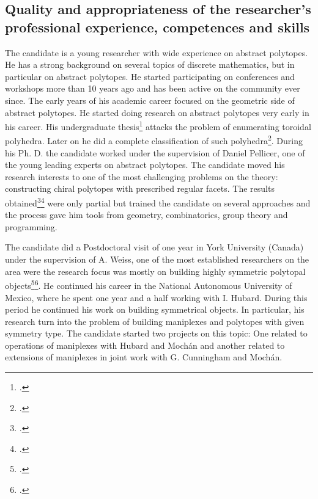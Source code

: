 \subsection{Quality and appropriateness of the researcher’s professional experience, competences and skills}
\label{sec:experience}


The candidate is a young researcher with wide experience on abstract polytopes.
He has a strong background on several topics of discrete mathematics, but in particular on abstract polytopes.
He started participating on conferences and workshops more than 10 years ago and has been active on the community ever since.
The early years of his academic career focused on the geometric side of abstract polytopes. He started doing research on abstract polytopes very early in his career. His undergraduate thesis\footcite{Montero_2013_PoliedrosRegularesEn} attacks the problem of enumerating toroidal polyhedra.
Later on he did a complete classification of such polyhedra\footcite{Montero_2018_RegularPolyhedra3}.
During his Ph. D. the candidate worked under the supervision of Daniel Pellicer, one of the young leading experts on abstract polytopes.
The candidate moved his research interests to one of the most challenging problems on the theory: constructing chiral polytopes with prescribed regular facets.
The results obtained\footcite{Montero_2019_ChiralExtensionsToroids_PhDThesis}\footcite{MonteroPellicerToledo__ChiralExtensionsRegular_preprint} were only partial but trained the candidate on several approaches and the process gave him tools from geometry, combinatorics, group theory and programming.

The candidate did a Postdoctoral visit of one year in York University (Canada) under the supervision of A. Weiss, one of the most established researchers on the area were the research focus was mostly on building highly symmetric polytopal objects\footcite{MonteroWeiss_2021_LocallySphericalHypertopes}\footcite{MonteroWeiss_2021_ProperLocallySpherical}.
He continued his career in the National Autonomous University of Mexico, where he spent one year and a half working with I. Hubard.
During this period he continued his work on building symmetrical objects.
In particular, his research turn into the problem of building maniplexes and polytopes with given symmetry type. The candidate started two projects on this topic: One related to operations of maniplexes with Hubard and Mochán and another related to extensions of maniplexes in joint work with G. Cunningham and Mochán.

